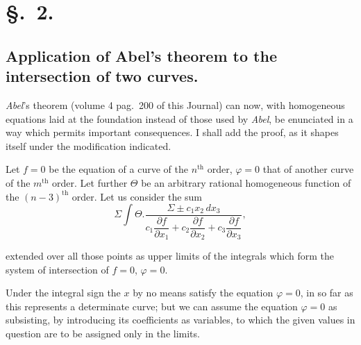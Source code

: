 \documentclass{article}
\begin{document}
\section*{§.~2.}
\subsection*{Application of Abel's theorem to the intersection of two curves.}

\emph{Abel}'s theorem (volume 4 pag.\ 200 of this Journal) can now, with homogeneous equations laid at the foundation instead of those used by \emph{Abel}, be enunciated in a way which permits important consequences. I shall add the proof, as it shapes itself under the modification indicated.

Let $f = 0$ be the equation of a curve of the $n^{\text{th}}$ order, $\varphi = 0$ that of another curve of the $m^{\text{th}}$ order. Let further $\Theta$ be an arbitrary rational homogeneous function of the $(n-3)^{\text{th}}$ order. Let us consider the sum
\[ \Sigma\int \Theta.\frac{\Sigma\pm c_{1}x_{2}\,dx_{3}}{c_{1}\dfrac{\partial f}{\partial x_{1}} + c_{2}\dfrac{\partial f}{\partial x_{2}} + c_{3}\dfrac{\partial f}{\partial x_{3}}}, \]

extended over all those points as upper limits of the integrals which form the system of intersection of $f = 0$, $\varphi = 0$.

Under the integral sign the $x$ by no means satisfy the equation $\varphi = 0$, in so far as this represents a determinate curve; but we can assume the equation $\varphi = 0$ as subsisting, by introducing its coefficients as variables, to which the given values in question are to be assigned only in the limits.
\end{document}
